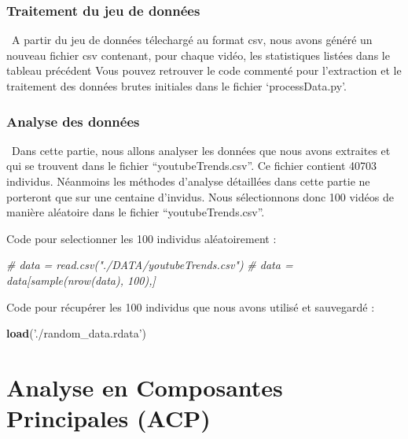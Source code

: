 \documentclass[
]{article}
\newenvironment{Shaded}{\begin{snugshade}}{\end{snugshade}}
\newcommand{\CommentTok}[1]{\textcolor[rgb]{0.56,0.35,0.01}{\textit{#1}}}
\newcommand{\KeywordTok}[1]{\textcolor[rgb]{0.13,0.29,0.53}{\textbf{#1}}}
\newcommand{\NormalTok}[1]{#1}
\newcommand{\StringTok}[1]{\textcolor[rgb]{0.31,0.60,0.02}{#1}}
\begin{document}
\hypertarget{traitement-du-jeu-de-donnuxe9es}{%
\subsubsection{Traitement du jeu de
données}\label{traitement-du-jeu-de-donnuxe9es}}

 A partir du jeu de données télechargé au format csv, nous avons généré
un nouveau fichier csv contenant, pour chaque vidéo, les statistiques
listées dans le tableau précédent Vous pouvez retrouver le code commenté
pour l'extraction et le traitement des données brutes initiales dans le
fichier `processData.py'.

\hypertarget{analyse-des-donnuxe9es}{%
\subsubsection{Analyse des données}\label{analyse-des-donnuxe9es}}

 Dans cette partie, nous allons analyser les données que nous avons
extraites et qui se trouvent dans le fichier ``youtubeTrends.csv''. Ce
fichier contient 40703 individus. Néanmoins les méthodes d'analyse
détaillées dans cette partie ne porteront que sur une centaine
d'invidus. Nous sélectionnons donc 100 vidéos de manière aléatoire dans
le fichier ``youtubeTrends.csv''.

Code pour selectionner les 100 individus aléatoirement :

\begin{Shaded}
\begin{Highlighting}[]
\CommentTok{# data = read.csv("./DATA/youtubeTrends.csv")}
\CommentTok{# data = data[sample(nrow(data), 100),]}
\end{Highlighting}
\end{Shaded}

Code pour récupérer les 100 individus que nous avons utilisé et
sauvegardé :

\begin{Shaded}
\begin{Highlighting}[]
\KeywordTok{load}\NormalTok{(}\StringTok{'./random_data.rdata'}\NormalTok{)}
\end{Highlighting}
\end{Shaded}

\hypertarget{analyse-en-composantes-principales-acp}{%
\section{Analyse en Composantes Principales
(ACP)}\label{analyse-en-composantes-principales-acp}}
\end{document}
